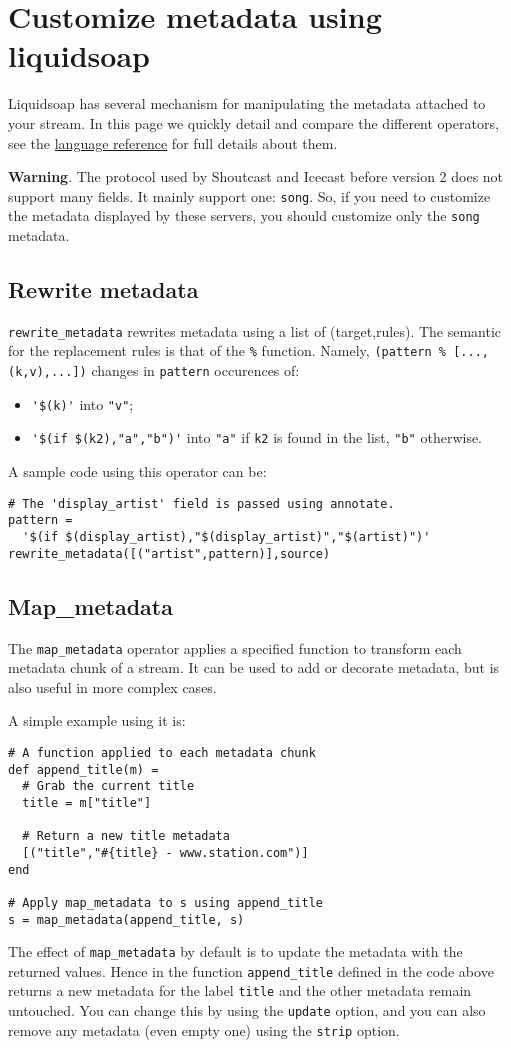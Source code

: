 \section{Customize metadata using liquidsoap}
Liquidsoap has several mechanism for manipulating the metadata attached to your stream. In this page we quickly detail and compare the different operators, see the \href{reference.html}{language reference} for full details about them.

\textbf{Warning}. The protocol used by Shoutcast and Icecast before version 2 does not support many fields. It mainly support one: \verb+song+. So, if you need to customize the metadata displayed by these servers, you should customize only the \verb+song+ metadata.

\subsection{Rewrite metadata}
\verb+rewrite_metadata+ rewrites metadata using a list of (target,rules). The semantic for the replacement rules is that of the \verb+%+ function. Namely, \verb+(pattern % [...,(k,v),...])+ changes in \verb+pattern+ occurences of:

\begin{itemize}
\item \verb+'$(k)'+ into \verb+"v"+;
\item \verb+'$(if $(k2),"a","b")'+ into \verb+"a"+ if \verb+k2+ is found in the list, \verb+"b"+ otherwise.

\end{itemize}
A sample code using this operator can be:

\begin{verbatim}
# The 'display_artist' field is passed using annotate.
pattern = 
  '$(if $(display_artist),"$(display_artist)","$(artist)")'
rewrite_metadata([("artist",pattern)],source)
\end{verbatim}
\subsection{Map\_metadata }
The \verb+map_metadata+ operator applies a specified function to transform each metadata chunk of a stream. It can be used to add or decorate metadata, but is also useful in more complex cases.

A simple example using it is:

\begin{verbatim}
# A function applied to each metadata chunk
def append_title(m) =
  # Grab the current title
  title = m["title"]

  # Return a new title metadata
  [("title","#{title} - www.station.com")]
end

# Apply map_metadata to s using append_title
s = map_metadata(append_title, s)
\end{verbatim}
The effect of \verb+map_metadata+ by default is to update the metadata with the returned values. 
Hence in the function \verb+append_title+ defined in the code above returns a new metadata for the 
label \verb+title+ and the other metadata remain untouched. You can change this by using the 
\verb+update+ option, and you can also remove any metadata (even empty one) using the \verb+strip+ option.

